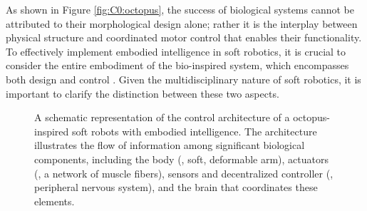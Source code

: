 As shown in Figure \ref{fig:C0:octopus}, the success of biological systems cannot be attributed to their morphological design alone; rather it is the interplay between physical structure and coordinated motor control that enables their functionality.
To effectively implement embodied intelligence in soft robotics, it is crucial to consider the entire embodiment of the bio-inspired system, which encompasses both design and control \cite{Rus2015,Hawkes2017}. Given the multidisciplinary nature of soft robotics, it is important to clarify the distinction between these two aspects.


\begin{figure}
  \centering
  
  \caption{\small A schematic representation of the control architecture of a octopus-inspired soft robots with embodied intelligence. The architecture illustrates the flow of information among significant biological components, including the body (\eg, soft, deformable arm), actuators (\eg, a network of muscle fibers), sensors and decentralized controller (\ie, peripheral nervous system), and the brain that coordinates these elements. \label{fig:C0:biometic} }
  \vspace{-3mm}
\end{figure}

